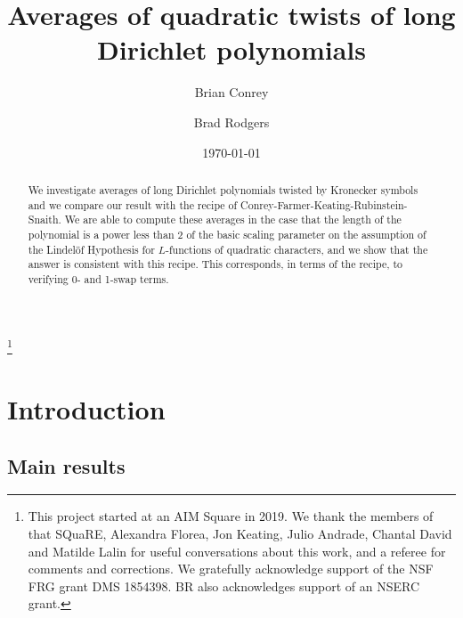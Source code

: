 \documentclass[12pt]{amsart}
\begin{document}
	
	
	\title{Averages of quadratic twists of long Dirichlet polynomials}
	
	\author{Brian Conrey}
	\address{American Institute of Mathematics, 600 East Brokaw Rd, San Jose, CA 95112, USA and School of Mathematics, University of Bristol, Bristol BS8 1TW, UK}
	\author{Brad Rodgers}
	\address{Queen's University, Kingston, ON Canada K7L 3N6}
	
	\thanks{This project started at an AIM Square in 2019. We thank the members of that SQuaRE, 
		Alexandra Florea, Jon Keating, Julio Andrade, Chantal David and Matilde Lalin for 
		useful conversations about this work, and a referee for comments and corrections. We gratefully acknowledge support of the NSF FRG grant DMS 1854398. BR also acknowledges support of an NSERC grant.}
	
	\date{\today}
	
	\begin{abstract} 
		We investigate 
		averages of long Dirichlet polynomials twisted by Kronecker symbols
		and we compare our result with the recipe of Conrey-Farmer-Keating-Rubinstein-Snaith. 
		We are able to compute these averages in the case that the length of the polynomial is a power less than 2 of the basic scaling parameter on the assumption of the Lindel\"of Hypothesis for $L$-functions of quadratic characters, and we show that the answer is consistent with this recipe. This corresponds, in terms of the recipe, to verifying 0- and 1-swap terms.
	\end{abstract}
	
	
	
	\maketitle
	
	\section{Introduction}
	\label{sec:intro}
	
	\subsection{Main results}
	\label{subsec:mainresults}
	
\end{document}
